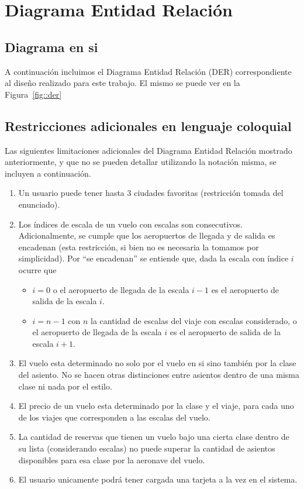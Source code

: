 \section{Diagrama Entidad Relaci\'on}

\subsection{Diagrama en si}

A continuaci\'on incluimos el Diagrama Entidad Relaci\'on (DER) correspondiente
al dise\~no realizado para este trabajo. El mismo se puede ver en la Figura~\ref{fig::der}

\subsection{Restricciones adicionales en lenguaje coloquial}

Las siguientes limitaciones adicionales del Diagrama Entidad Relaci\'on mostrado anteriormente,
y que no se pueden detallar utilizando la notaci\'on misma, se incluyen a continuaci\'on.

\begin{enumerate}
	\item Un usuario puede tener hasta 3 ciudades favoritas (restricci\'on tomada del enunciado).
	\item Los \'indices de escala de un vuelo con escalas son consecutivos. Adicionalmente, se cumple
	que los aeropuertos de llegada y de salida es encadenan (esta restricci\'on, si bien no es necesaria
	la tomamos por simplicidad). Por ``se encadenan'' se entiende que, dada la escala con \'indice $i$
	ocurre que
	
	\begin{itemize}
		\item $i = 0$ o el aeropuerto de llegada de la escala $i-1$ es el aeropuerto de salida de
		la escala $i$.
		\item $i = n-1$ con $n$ la cantidad de escalas del viaje con escalas considerado, o el aeropuerto
		de llegada de la escala $i$ es el aeropuerto de salida de la escala $i+1$.
	\end{itemize}
	
	\item El vuelo esta determinado no solo por el vuelo en si sino tambi\'en por la clase del asiento. No se
	hacen otras distinciones entre asientos dentro de una misma clase ni nada por el estilo.
	\item El precio de un vuelo esta determinado por la clase y el viaje, para cada uno de los viajes que corresponden
	a las escalas del vuelo.
	\item La cantidad de reservas que tienen un vuelo bajo una cierta clase dentro de su lista (considerando escalas)
	no puede superar la cantidad de asientos disponibles para esa clase por la aeronave del vuelo.
    \item El usuario unicamente podr\'a tener cargada una tarjeta a la vez en el sistema.
\end{enumerate}

